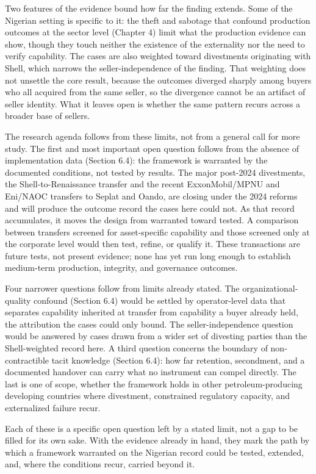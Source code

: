 Two features of the evidence bound how far the finding extends. Some of
the Nigerian setting is specific to it: the theft and sabotage that
confound production outcomes at the sector level (Chapter 4) limit what
the production evidence can show, though they touch neither the
existence of the externality nor the need to verify capability. The
cases are also weighted toward divestments originating with Shell, which
narrows the seller-independence of the finding. That weighting does not
unsettle the core result, because the outcomes diverged sharply among
buyers who all acquired from the same seller, so the divergence cannot
be an artifact of seller identity. What it leaves open is whether the
same pattern recurs across a broader base of sellers.

The research agenda follows from these limits, not from a general call
for more study. The first and most important open question follows from
the absence of implementation data (Section 6.4): the framework is
warranted by the documented conditions, not tested by results. The major
post-2024 divestments, the Shell-to-Renaissance transfer and the recent
ExxonMobil/MPNU and Eni/NAOC transfers to Seplat and Oando, are closing
under the 2024 reforms and will produce the outcome record the cases
here could not. As that record accumulates, it moves the design from
warranted toward tested. A comparison between transfers screened for
asset-specific capability and those screened only at the corporate level
would then test, refine, or qualify it. These transactions are future
tests, not present evidence; none has yet run long enough to establish
medium-term production, integrity, and governance outcomes.

Four narrower questions follow from limits already stated. The
organizational-quality confound (Section 6.4) would be settled by
operator-level data that separates capability inherited at transfer from
capability a buyer already held, the attribution the cases could only
bound. The seller-independence question would be answered by cases drawn
from a wider set of divesting parties than the Shell-weighted record
here. A third question concerns the boundary of non-contractible tacit
knowledge (Section 6.4): how far retention, secondment, and a documented
handover can carry what no instrument can compel directly. The last is
one of scope, whether the framework holds in other petroleum-producing
developing countries where divestment, constrained regulatory capacity,
and externalized failure recur.

Each of these is a specific open question left by a stated limit, not a
gap to be filled for its own sake. With the evidence already in hand,
they mark the path by which a framework warranted on the Nigerian record
could be tested, extended, and, where the conditions recur, carried
beyond it.

